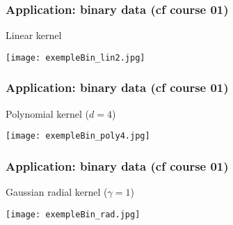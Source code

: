 \documentclass[compress, smaller, serif, 9pt]{beamer}
\begin{document}
\begin{frame}
  \frametitle{Application: binary data  (cf course 01)}


\begin{block}{Linear kernel}
 \end{block}

\begin{center}
\texttt{[image: exempleBin\_lin2.jpg]}%
\end{center}

\end{frame}

\begin{frame}
  \frametitle{Application: binary data  (cf course 01)}


\begin{block}{Polynomial kernel ($d=4$)}
 \end{block}

\begin{center}
\texttt{[image: exempleBin\_poly4.jpg]}\\
\color{blue}{$C \approx 1$}
\end{center}

\end{frame}


\begin{frame}
  \frametitle{Application: binary data  (cf course 01)}


\begin{block}{Gaussian radial kernel ($\gamma=1$)}
 \end{block}

\begin{center}
\texttt{[image: exempleBin\_rad.jpg]}\\
\color{blue}{$C \approx 1$}
\end{center}

\end{frame}
\end{document}
